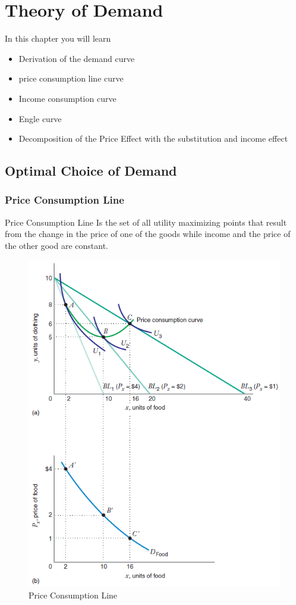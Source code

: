 \documentclass[../ECON-281-Notes.tex]{subfiles}
\begin{document}
\chapter{Theory of Demand}
In this chapter you will learn
\begin{itemize}
    \item Derivation of the demand curve
    \item price consumption line curve
    \item Income consumption curve
    \item Engle curve
    \item Decomposition of the Price Effect with the substitution and income effect
\end{itemize}

\section{Optimal Choice of Demand}
\subsection{Price Consumption Line}
\begin{Definition}
    {Price Consumption Line}
    Is the set of all utility maximizing points that result from the change in the price of one of the goods while income and the price of the other good are constant.
\end{Definition}


\begin{figure}[htbp]
    \centering
    \includegraphics[width=0.8\columnwidth]{../assets/Price-consumption-line.png}
    \caption{Price Consumption Line}
    \label{fig:price-consumption-line}
\end{figure}
\end{document}
